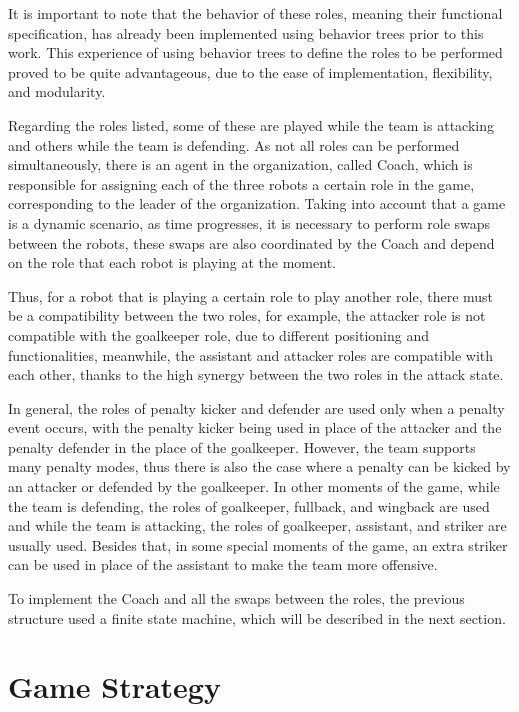 It is important to note that the behavior of these roles, meaning their functional specification, has already been implemented using behavior trees prior to this work. This experience of using behavior trees to define the roles to be performed proved to be quite advantageous, due to the ease of implementation, flexibility, and modularity.

Regarding the roles listed, some of these are played while the team is attacking and others while the team is defending. As not all roles can be performed simultaneously, there is an agent in the organization, called Coach, which is responsible for assigning each of the three robots a certain role in the game, corresponding to the leader of the organization. Taking into account that a game is a dynamic scenario, as time progresses, it is necessary to perform role swaps between the robots, these swaps are also coordinated by the Coach and depend on the role that each robot is playing at the moment.

Thus, for a robot that is playing a certain role to play another role, there must be a compatibility between the two roles, for example, the attacker role is not compatible with the goalkeeper role, due to different positioning and functionalities, meanwhile, the assistant and attacker roles are compatible with each other, thanks to the high synergy between the two roles in the attack state.

In general, the roles of penalty kicker and defender are used only when a penalty event occurs, with the penalty kicker being used in place of the attacker and the penalty defender in the place of the goalkeeper. However, the team supports many penalty modes, thus there is also the case where a penalty can be kicked by an attacker or defended by the goalkeeper. In other moments of the game, while the team is defending, the roles of goalkeeper, fullback, and wingback are used and while the team is attacking, the roles of goalkeeper, assistant, and striker are usually used. Besides that, in some special moments of the game, an extra striker can be used in place of the assistant to make the team more offensive.

To implement the Coach and all the swaps between the roles, the previous structure used a finite state machine, which will be described in the next section. 

\section{Game Strategy}

